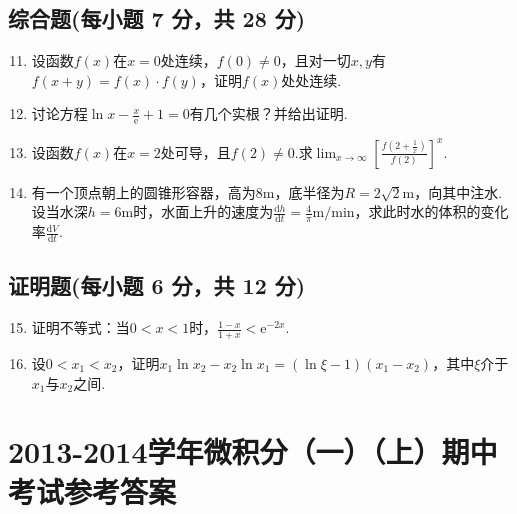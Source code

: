 \documentclass[../main.tex]{subfiles}
\begin{document}
\section{综合题(每小题 7 分，共 28 分)}
\begin{enumerate}
    \setcounter{enumi}{10}
    \item 设函数$f(x)$在$x=0$处连续，$f(0)\neq0$，且对一切$x,y$有$f(x+y)=f(x
              )\cdot f(y)$，证明$f(x)$处处连续.
          \vspace{13em}

    \item 讨论方程$\ln x-\frac{x}{\mathrm{e}}+1=0$有几个实根？并给出证明.
          \vspace{12em}

    \item 设函数$f(x)$在$x=2$处可导，且$f(2)\neq0$.求$\lim_{x\to\infty}\left
              [\frac{f\left(2+\frac{1}{x}\right)}{f(2)}\right]^{x}$.
          \vspace{12em}

    \item 有一个顶点朝上的圆锥形容器，高为$8\mathrm{m}$，底半径为$R=2\sqrt{2}
              \mathrm{m}$，向其中注水.设当水深$h=6\mathrm{m}$时，水面上升的速度为$\frac{\mathrm{d}h}{\mathrm{d}t}
              =\frac{4}{\pi}\mathrm{m/min}$，求此时水的体积的变化率$\frac{\mathrm{d}V}{\mathrm{d}t}$.
          \vspace{11em}
\end{enumerate}

\section{证明题(每小题 6 分，共 12 分)}
\begin{enumerate}
    \setcounter{enumi}{14}
    \item 证明不等式：当$0<x<1$时，$\frac{1-x}{1+x}<\mathrm{e}^{-2x}$.
          \vspace{12em}

    \item 设$0<x_{1}<x_{2}$，证明$x_{1}\ln x_{2}-x_{2}\ln x_{1}=(\ln\xi-1)(x
                  _{1}-x_{2})$，其中$\xi$介于$x_{1}$与$x_{2}$之间.
          \vspace{12em}
\end{enumerate}

\chapter{2013-2014学年微积分（一）（上）期中考试参考答案}
\end{document}
